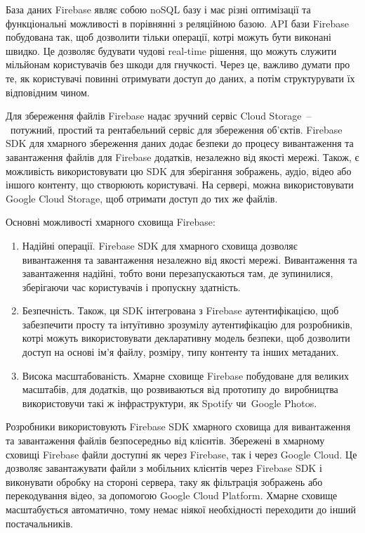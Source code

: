 \documentclass[../main.tex]{subfiles}
\begin{document}
База даних Firebase являє собою noSQL базу і має різні оптимізації та функціональні можливості в порівнянні з реляційною базою. API бази Firebase побудована так, щоб дозволити тільки операції, котрі можуть бути виконані швидко. Це дозволяє будувати чудові real-time рішення, що можуть служити мільйонам користувачів без шкоди для гнучкості. Через це, важливо думати про те, як користувачі повинні отримувати доступ до даних, а потім структурувати їх відповідним чином.

Для збереження файлів Firebase надає зручний сервіс Cloud Storage~--~потужний, простий та рентабельний сервіс для збереження об'єктів. Firebase SDK для хмарного збереження даних додає безпеки до процесу вивантаження та завантаження файлів для Firebase додатків, незалежно від якості мережі. Також, є можливість використовувати цю SDK для зберігання зображень, аудіо, відео або іншого контенту, що створюють користувачі. На сервері, можна використовувати Google Cloud Storage, щоб отримати доступ до тих же файлів.

Основні можливості хмарного сховища Firebase:
\begin{enumerate}
	\item Надійні операції. Firebase SDK для хмарного сховища дозволяє вивантаження та завантаження незалежно від якості мережі. Вивантаження та завантаження надійні, тобто вони перезапускаються там, де зупинилися, зберігаючи час користувачів і пропускну здатність.
	\item Безпечність. Також, ця SDK інтегрована з Firebase аутентифікацією, щоб забезпечити просту та інтуїтивно зрозумілу аутентифікацію для розробників, котрі можуть використовувати декларативну модель безпеки, щоб дозволити доступ на основі ім'я файлу, розміру, типу контенту та інших метаданих.
	\item Висока масштабованість. Хмарне сховище Firebase побудоване для великих масштабів, для додатків, що розвиваються від прототипу до~виробництва використовучи такі ж інфраструктури, як Spotify чи~Google Photos.
\end{enumerate}

Розробники використовують Firebase SDK хмарного сховища для вивантаження та завантаження файлів безпосередньо від клієнтів. Збережені в хмарному сховищі Firebase файли доступні як через Firebase, так і через Google Cloud. Це дозволяє завантажувати файли з мобільних клієнтів через Firebase SDK і виконувати обробку на стороні сервера, таку як фільтрація зображень або перекодування відео, за допомогою Google Cloud Platform. Хмарне сховище масштабується автоматично, тому немає ніякої необхідності переходити до інший постачальників.
\end{document}
